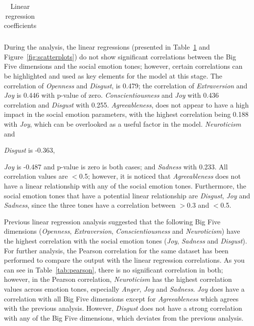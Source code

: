 \documentclass[graybox]{svmult}
\begin{document}
{\begin{table}[!ht]
{\begin{tabular}{@{}llll|lll|lll|lll|lll@{}}
\bottomrule

\end{tabular}%
}
\caption{Linear regression coefficients}
\label{tbl:linreg}
\end{table}

During the analysis, the linear regressions (presented in Table~\ref{tbl:linreg} and
Figure~\ref{fig:scatterplots}) do not show significant correlations
between the Big Five dimensions and the social emotion tones; however,
certain correlations can be highlighted and used as key elements for
the model at this stage. The correlation of {\emph{Openness} and
{\emph{Disgust}}, is 0.479; the correlation of {\emph{Extraversion}}
and {\emph{Joy}} is 0.446 with p-value of
zero. {\emph{Conscientiousness}} and {\emph{Joy}} with 0.436
correlation and \emph{Disgust}} with 0.255. {\emph{Agreeableness}},
does not appear to have a high impact in the social emotion
parameters, with the highest correlation being 0.188 with
{\emph{Joy}}, which can be overlooked as a useful factor in the
model. {\emph{Neuroticism}} and {\emph{Disgust} is -0.363, {\emph{Joy}
is -0.487 and p-value is zero is both cases; and {\emph{Sadness}} with
0.233. All correlation values are $<$0.5; however, it is noticed that
{\emph{Agreeableness}} does not have a linear relationship with any of
the social emotion tones. Furthermore, the social emotion tones that
have a potential linear relationship are {\emph{Disgust}},
{\emph{Joy}} and {\emph{Sadness}}, since the three tones have a
correlation between $>$0.3 and $<$0.5.

Previous linear regression analysis suggested that the following Big
Five dimensions ({\emph{Openness}}, {\emph{Extraversion}},
{\emph{Conscientiousness}} and {\emph{Neuroticism}}) have the highest
correlation with the social emotion tones ({\emph{Joy}},
{\emph{Sadness}} and {\emph{Disgust}}). For further analysis, the
Pearson correlation for the same dataset has been performed to compare
the output with the linear regression correlations. As you can see in
Table~\ref{tab:pearson}, there is no significant correlation in both;
however, in the Pearson correlation, {\emph{Neuroticism}} has the
highest correlation values across emotion tones, especially
{\emph{Anger}}, {\emph{Joy}} and {\emph{Sadness}}. {\emph{Joy}} does
have a correlation with all Big Five dimensions except for
{\emph{Agreeableness}} which agrees with the previous
analysis. However, {\emph{Disgust}} does not have a strong correlation
with any of the Big Five dimensions, which deviates from the previous
analysis.

}}}
\end{document}

